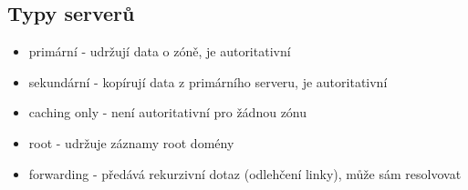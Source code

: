 \documentclass{szzclass}
\providecommand{\tightlist}{%
  \setlength{\itemsep}{0pt}\setlength{\parskip}{0pt}}
\begin{document}
\hypertarget{typy-serverux16f}{%
\subsection{Typy serverů}\label{typy-serverux16f}}

\begin{itemize}
\tightlist
\item
  primární - udržují data o zóně, je autoritativní
\item
  sekundární - kopírují data z primárního serveru, je autoritativní
\item
  caching only - není autoritativní pro žádnou zónu
\item
  root - udržuje záznamy root domény
\item
  forwarding - předává rekurzivní dotaz (odlehčení linky), může sám
  resolvovat
\end{itemize}
\end{document}
